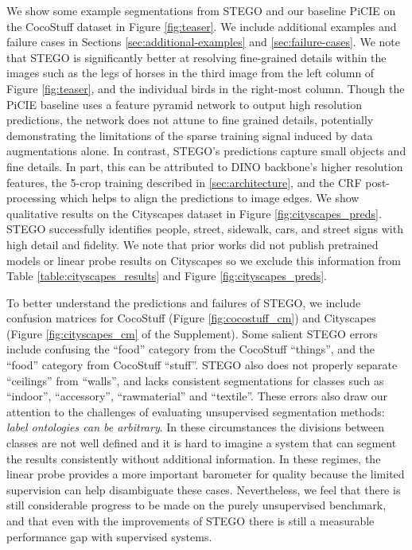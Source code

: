 \documentclass{article} \usepackage{iclr2022_conference,times}
\begin{document}
We show some example segmentations from STEGO and our baseline PiCIE on the CocoStuff dataset in Figure \ref{fig:teaser}. We include additional examples and failure cases in Sections \ref{sec:additional-examples} and \ref{sec:failure-cases}. We note that STEGO is significantly better at resolving fine-grained details within the images such as the legs of horses in the third image from the left column of Figure \ref{fig:teaser}, and the individual birds in the right-most column. Though the PiCIE baseline uses a feature pyramid network to output high resolution predictions, the network does not attune to fine grained details, potentially demonstrating the limitations of the sparse training signal induced by data augmentations alone. In contrast, STEGO's predictions capture small objects and fine details. In part, this can be attributed to DINO backbone's higher resolution features, the 5-crop training described in \ref{sec:architecture}, and the CRF post-processing which helps to align the predictions to image edges. We show qualitative results on the Cityscapes dataset in Figure \ref{fig:cityscapes_preds}. STEGO successfully identifies people, street, sidewalk, cars, and street signs with high detail and fidelity. We note that prior works did not publish pretrained models or linear probe results on Cityscapes so we exclude this information from Table \ref{table:cityscapes_results} and Figure \ref{fig:cityscapes_preds}.

To better understand the predictions and failures of STEGO, we include confusion matrices for CocoStuff (Figure \ref{fig:cocostuff_cm}) and Cityscapes (Figure \ref{fig:cityscapes_cm} of the Supplement). Some salient STEGO errors include confusing the ``food'' category from the CocoStuff ``things'', and the ``food'' category from CocoStuff ``stuff''. STEGO also does not properly separate ``ceilings'' from ``walls'', and lacks consistent segmentations for classes such as ``indoor'', ``accessory'', ``rawmaterial'' and ``textile''. These errors also draw our attention to the challenges of evaluating unsupervised segmentation methods: \textit{label ontologies can be arbitrary}. In these circumstances the divisions between classes are not well defined and it is hard to imagine a system that can segment the results consistently without additional information. In these regimes, the linear probe provides a more important barometer for quality because the limited supervision can help disambiguate these cases. Nevertheless, we feel that there is still considerable progress to be made on the purely unsupervised benchmark, and that even with the improvements of STEGO there is still a measurable performance gap with supervised systems.
\end{document}
